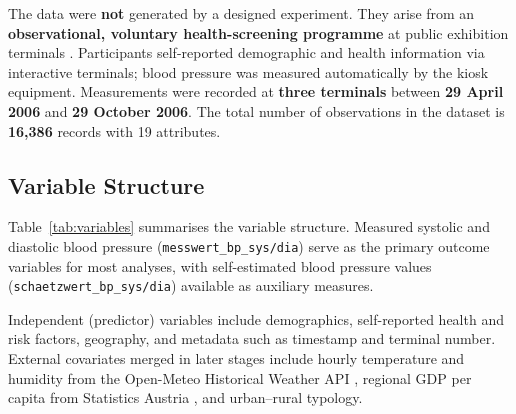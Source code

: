 The data were \textbf{not} generated by a designed experiment. They arise from an \textbf{observational, voluntary health-screening programme} at public exhibition terminals \cite{styrian_health_data}. Participants self-reported demographic and health information via interactive terminals; blood pressure was measured automatically by the kiosk equipment. Measurements were recorded at \textbf{three terminals} between \textbf{29 April 2006} and \textbf{29 October 2006}. The total number of observations in the dataset is \textbf{16,386} records with 19 attributes.

\subsection{Variable Structure}

Table~\ref{tab:variables} summarises the variable structure. Measured systolic and diastolic blood pressure (\texttt{messwert\_bp\_sys/dia}) serve as the primary outcome variables for most analyses, with self-estimated blood pressure values (\texttt{schaetzwert\_bp\_sys/dia}) available as auxiliary measures.

Independent (predictor) variables include demographics, self-reported health and risk factors, geography, and metadata such as timestamp and terminal number. External covariates merged in later stages include hourly temperature and humidity from the Open-Meteo Historical Weather API \cite{open_meteo}, regional GDP per capita from Statistics Austria \cite{statistik_atlas}, and urban--rural typology.

